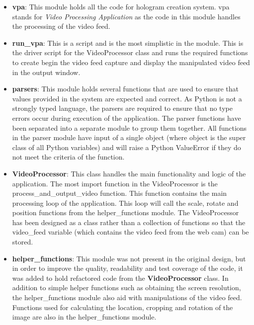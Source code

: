 \begin{itemize}
	\item \textbf{vpa}: This module holds all the code for hologram creation system. vpa stands for \textit{Video Processing Application} as the code in this module handles the processing of the video feed.

	\item \textbf{run\_vpa}: This is a script and is the most simplistic in the module. This is the driver script for the VideoProcessor class and runs the required functions to create begin the video feed  capture and display the manipulated video feed in the output window.

	\item \textbf{parsers}: This module holds several functions that are used to ensure that values provided in the system are expected and correct. As Python is not a strongly typed language, the parsers are required to ensure that no type errors occur during execution of the application. The parser functions have been separated into a separate module to group them together. All functions in the parser module have input of a single object (where object is the super class of all Python variables) and will raise a Python ValueError if they do not meet the criteria of the function.

	\item \textbf{VideoProcessor}: This class handles the main functionality and logic of the application. The most import function in the VideoProcessor is the process\_and\_output\_video function. This function contains the main processing loop of the application. This loop will call the scale, rotate and position functions from the helper\_functions module. 
	The VideoProcessor has been designed as a class rather than a collection of functions so that the video\_feed variable (which contains the video feed from the web cam) can be stored.  

	\item \textbf{helper\_functions}: This module was not present in the original design, but in order to improve the quality, readability and test coverage of the code, it was added to hold refactored code from the \textbf{VideoProcessor} class. In addition to simple helper functions such as obtaining the screen resolution, the helper\_functions module also aid with manipulations of the video feed. Functions used for calculating the location, cropping and rotation of the image are also in the helper\_functions module. 

\end{itemize}


